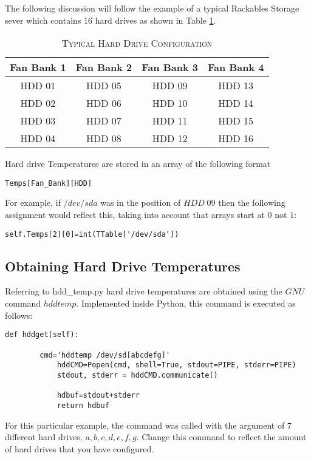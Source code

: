 \documentclass[10pt,letterpaper]{report}
\begin{document}
The following discussion will follow the example of a typical Rackables Storage sever which contains 16 hard drives as shown in Table \ref{table:HDD}.
%
\begin{table}[htbp]
\begin{center}
\caption{\textsc{Typical Hard Drive Configuration}}
\vspace{0.05in}
\begin{tabular}{ |c|c|c|c| }
  \hline
  Fan Bank 1 & Fan Bank 2 & Fan Bank 3 & Fan Bank 4 \\
  \hline
   HDD 01 & HDD 05 & HDD 09 & HDD 13 \\
  \hline
   HDD 02 & HDD 06 & HDD 10 & HDD 14 \\
  \hline
   HDD 03 & HDD 07 & HDD 11 & HDD 15 \\
  \hline
   HDD 04 & HDD 08 & HDD 12 & HDD 16 \\
  \hline
\end{tabular}
\label{table:HDD}
\end{center}
\end{table}
%
Hard drive Temperatures are stored in an array of the following format
%
\begin{verbatim}
Temps[Fan_Bank][HDD]
\end{verbatim}
%
For example, if $/dev/sda$ was in the position of $HDD \; 09$ then the following assignment would reflect this, taking into account that arrays start at $0$ not $1$:
%
\begin{verbatim}
self.Temps[2][0]=int(TTable['/dev/sda'])
\end{verbatim}

\subsection{Obtaining Hard Drive Temperatures}

Referring to hdd\_temp.py hard drive temperatures are obtained using the $GNU$ command $hddtemp$. Implemented inside Python, this command is executed as follows:
\begin{verbatim}
def hddget(self):

		cmd='hddtemp /dev/sd[abcdefg]'	
	        hddCMD=Popen(cmd, shell=True, stdout=PIPE, stderr=PIPE)
     		stdout, stderr = hddCMD.communicate()

        	hdbuf=stdout+stderr
	        return hdbuf
\end{verbatim}
For this particular example, the command was called with the argument of $7$ different hard drives, $a,b,c,d,e,f,g$. Change this command to reflect the amount of hard drives that you have configured.
\end{document}
